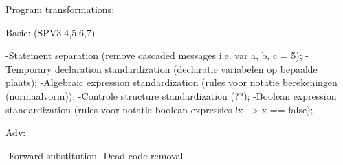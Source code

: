 











  Program transformations:

  	Basic: (SPV3,4,5,6,7)

  	-Statement separation	(remove cascaded messages i.e. var a, b, c = 5);
  	-Temporary declaration standardization (declaratie variabelen op bepaalde plaats);
  	-Algebraic expression standardization (rules voor notatie berekeningen (normaalvorm));
  	-Controle structure standardization (??);
  	-Boolean expression standardization (rules voor notatie boolean expressies !x --> x == false);


  	Adv:

  	-Forward substitution
  	-Dead code removal

